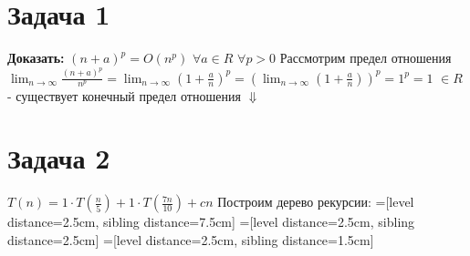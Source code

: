 \documentclass[12pt]{article}
\begin{document}
	\section*{Задача 1}
			\textbf{Доказать: } ${(n + a)}^p = O({n}^p)$ \newline
			$\forall a \in R$ \newline
			$\forall p > 0$ \newline
			Рассмотрим предел отношения \newline
			$\lim_{n\to\infty} \frac{{(n + a)}^p}{{n}^p}={\lim_{n\to\infty} (1 + \frac{a}{n})}^p = {(\lim_{n\to\infty} (1 + \frac{a}{n}))}^p = {1}^p = 1$ $\in R$ - существует конечный предел отношения \newline
			$\Downarrow$ \\
	\section*{Задача 2}
	$T(n) = 1\cdot T(\frac{n}{5}) + 1\cdot T(\frac{7n}{10}) + cn$ \newline
	Построим дерево рекурсии: \newline
	=[level distance=2.5cm, sibling distance=7.5cm]
	=[level distance=2.5cm, sibling distance=2.5cm]
	=[level distance=2.5cm, sibling distance=1.5cm]
	
\end{document}

